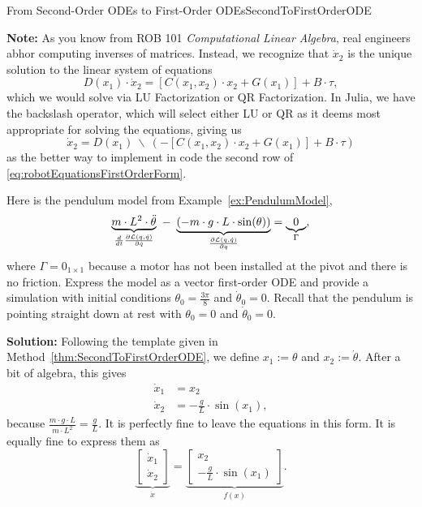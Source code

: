 \begin{methodColor}{From Second-Order ODEs to First-Order ODEs}{SecondToFirstOrderODE}
\bigskip

\textbf{Note:} As you know from ROB 101 \textit{Computational Linear Algebra}, real engineers abhor computing inverses of matrices. Instead, we recognize that $\dot{x}_2$ is the unique solution to the linear system of equations 
$$D(x_1) \cdot \dot{x}_2  =   \left[ C(x_1, x_2) \cdot x_2 + G(x_1) \right] +B \cdot \tau,$$
which we would solve via LU Factorization or QR Factorization. In Julia, we have the backslash operator, which will select either LU or QR as it deems most appropriate for solving the equations, giving us
$$\dot{x}_2  = D(x_1) ~\backslash~\left(- \left[ C(x_1, x_2) \cdot x_2 + G(x_1) \right] +B \cdot \tau \right)$$
as the better way to implement in code the second row of \eqref{eq:robotEquationsFirstOrderForm}.
    
\end{methodColor}

\bigskip

\begin{example} 
\label{ex:PendulumModelTake2}
Here is the pendulum model from Example~\ref{ex:PendulumModel},
\begin{equation}
\label{eq:DddotqPendulumV02}
    \underbrace{m \cdot L^2 \cdot \ddot{\theta}}_{ \frac{d}{dt} \frac{ \partial {\cal L}(q, \dot{q})}{\partial\dot{q}}}~ -~ \underbrace{\left(- m\cdot g\cdot L \cdot \sin(\theta) \right)}_{\frac{ \partial {\cal L}(q, \dot{q})}{\partial q}}
= \underbrace{0}_{\Gamma},
\end{equation}
where $\Gamma = 0_{1 \times 1}$ because a motor has not been installed at the pivot and there is no friction. Express the model as a vector first-order ODE and provide a simulation with initial conditions 
$\theta_0 = \frac{3 \pi}{8}$ and $\dot{\theta}_0 = 0$. Recall that the pendulum is pointing straight down at rest with $\theta_0 = 0$ and $\dot{\theta}_0 = 0$.
\end{example}
\textbf{Solution:} Following the template given in Method~\ref{thm:SecondToFirstOrderODE}, we define $x_1:=\theta$ and $x_2:=\dot{\theta}$. After a bit of algebra, this gives
\begin{align*}
    \dot{x}_1 &= x_2 \\
    \dot{x}_2 & = -\frac{g}{L}  \cdot \sin(x_1),
\end{align*}
because $\frac{m\cdot g\cdot L}{m \cdot L^2 } = \frac{g}{L}$. It is perfectly fine to leave the equations in this form. It is equally fine to express them as
$$
\underbrace{\left[ \begin{array}{c} \dot{x}_1 \\ \dot{x}_2 \end{array} \right]}_{\dot x} = \underbrace{ \left[\begin{array}{c} x_2 \\  -\frac{g}{L}  \cdot \sin(x_1)\end{array} \right]}_{f(x)}.
$$

